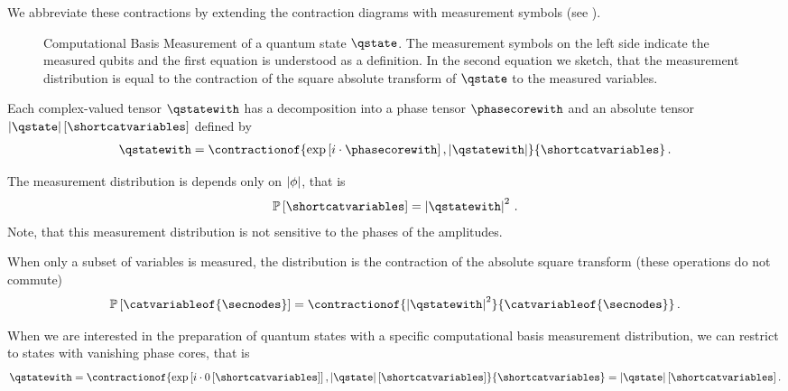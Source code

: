 We abbreviate these contractions by extending the contraction diagrams with measurement symbols (see ).
\begin{figure}
    \begin{center}
        
    \end{center}
    \caption{Computational Basis Measurement of a quantum state $\qstate$.
    The measurement symbols on the left side indicate the measured qubits and the first equation is understood as a definition.
    In the second equation we sketch, that the measurement distribution is equal to the contraction of the square absolute transform of $\qstate$ to the measured variables.
    }\label{fig:measurementSketch}
\end{figure}

Each complex-valued tensor $\qstatewith$ has a decomposition into a phase tensor $\phasecorewith$ and an absolute tensor $\absof{\qstate}[\shortcatvariables]$ defined by
\begin{align*}
    \qstatewith = \contractionof{\expof{i\cdot\phasecorewith}, \absof{\qstatewith}}{\shortcatvariables}\, .
\end{align*}

The measurement distribution is depends only on $\left|\phi\right|$, that is
\begin{align*}
    \probwith = \absof{\qstatewith}^2 \, .
\end{align*}
Note, that this measurement distribution is not sensitive to the phases of the amplitudes.

When only a subset of variables is measured, the distribution is the contraction of the absolute square transform (these operations do not commute)
\begin{align*}
    \probat{\catvariableof{\secnodes}}
    = \contractionof{\absof{\qstatewith}^2}{\catvariableof{\secnodes}} \, .
\end{align*}

When we are interested in the preparation of quantum states with a specific computational basis measurement distribution, we can restrict to states with vanishing phase cores, that is
\begin{align*}
    \qstatewith
    = \contractionof{\expof{i\cdot\zerosat{\shortcatvariables}}, \absof{\qstate}[\shortcatvariables]}{\shortcatvariables}
    = \absof{\qstate}[\shortcatvariables]  \, .
\end{align*}

